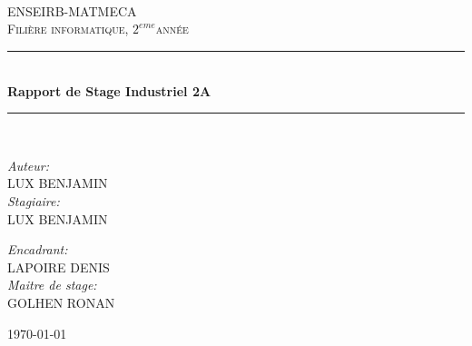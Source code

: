 \documentclass[a4paper,oneside,11pt]{article}
\def\titre{Rapport de Stage Industriel 2A}
\def\filiere{informatique}
\def\annee{$2^{eme}$}
\def\equipe{LUX BENJAMIN}
\def\encadrant{LAPOIRE DENIS}
\def\tuteur{GOLHEN RONAN}
\newcommand{\HRule}{\rule{\linewidth}{0.5mm}}
\begin{document}
\begin{titlepage}

\begin{center}


\begin{center}
\end{center}
~\\
~\\
~\\
\textsc{\LARGE ENSEIRB-MATMECA}\\[1cm]

\textsc{\Large {Fili\`ere \filiere, \annee ann\'ee}}\\[0.5cm]

\HRule \\[0.4cm]
{ \huge \bfseries \titre}\\[0.4cm]


\HRule \\[1.5cm]


\begin{minipage}{0.4\textwidth}
\begin{flushleft} \large
\emph{Auteur:}\\
\equipe\\[3\baselineskip]
\emph{Stagiaire:}\\
\equipe
\end{flushleft}
\end{minipage}
\begin{minipage}{0.4\textwidth}
\begin{flushright} \large
\emph{Encadrant:} \\
\encadrant\\[3\baselineskip]
\emph{Maitre de stage:} \\
\tuteur
\end{flushright}
\end{minipage}


\vfill

{\large \today}

\end{center}

\end{titlepage}
\tableofcontents\thispagestyle{fancy}
\newpage
\end{document}
